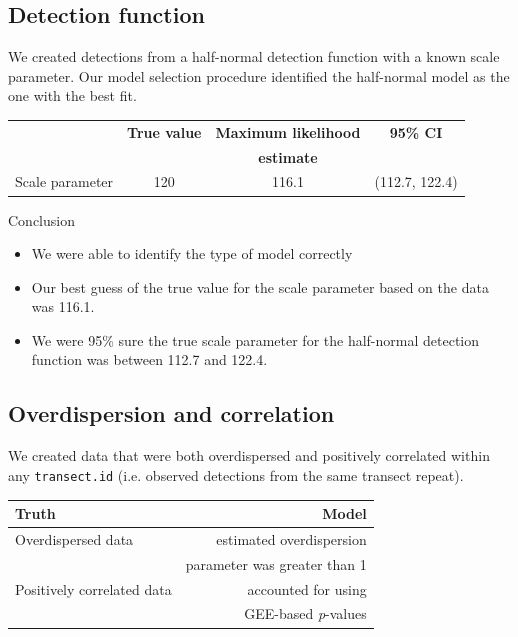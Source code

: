 \subsection{Detection function}
We created detections from a half-normal detection function with a known scale parameter. Our model selection procedure identified the half-normal model as the one with the best fit. 
\begin{table}[h]
\begin{tabular}{l|c|c|c}
 & \textbf{True value} & \textbf{Maximum likelihood} & \textbf{95\% CI} \\
 & & \textbf{estimate} & \\
\hline
{Scale parameter}& 120 & 116.1  &(112.7, 122.4)\\
\end{tabular}
\end{table}
\begin{block}{Conclusion}
\begin{itemize}
\item{We were able to identify the type of model correctly} 
\item{Our best guess of the true value for the scale parameter based on the data was 116.1. }
\item{We were 95\% sure the true scale parameter for the half-normal detection function was between 112.7 and 122.4.}
\end{itemize}
\end{block}

\subsection{Overdispersion and correlation}
We created data that were both overdispersed and positively correlated within any {\tt transect.id} (i.e. observed detections from the same transect repeat). 

\begin{table}[ht]
\centering
\begin{tabular}{l|r}
\textbf{Truth} & \textbf{Model}\\
\hline
Overdispersed  data & estimated overdispersion \\
 & parameter was greater than 1\\
\hline
Positively correlated data & accounted for using\\
 & GEE-based \textit{p}-values\\
\end{tabular}\end{table}

